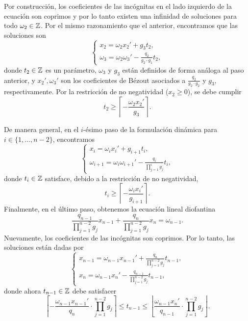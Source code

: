 Por construcción, los coeficientes de las incógnitas en el lado izquierdo de la ecuación son
coprimos y por lo tanto existen una infinidad de soluciones para todo $\omega_2 \in \mathbb{Z}$. Por el
mismo razonamiento que el anterior, encontramos que las soluciones son
\begin{equation*}
	\begin{cases}
		x_2 = \omega_2x_2' + g_3t_2, \\
		\omega_3 = \omega_2\omega_3' - \frac{q_2}{g_2 \cdot g_1}t_2,
	\end{cases}
\end{equation*}
donde $t_2 \in \mathbb{Z}$ es un parámetro, $\omega_3$ y $g_3$ están definidos de forma análoga al paso
anterior, y $x_2', \omega_3'$ son los coeficientes de Bézout asociados a $\frac{q_2}{g_2 \cdot g_2}$
y $g_3$, respectivamente. Por la restricción de no negatividad ($x_2 \geq 0$), se debe cumplir
\begin{equation*}
	t_2 \geq \left\lceil -\frac{\omega_2x_2'}{g_3} \right\rceil.
\end{equation*}

De manera general, en el $i$-ésimo paso de la formulación dinámica para $i \in \lbrace 1, \ldots, n
- 2 \rbrace$, encontramos
\begin{equation}
	\label{phase-1:eq:recursive}
	\begin{cases}
		x_i = \omega_ix_i' + g_{i + 1}t_i, \\
		\omega_{i + 1} = \omega_i\omega_{i + 1}' - \frac{q_i}{\prod_{j=1}^{i}g_j}t_i,
	\end{cases}
\end{equation}
donde $t_i \in \mathbb{Z}$ satisface, debido a la restricción de no negatividad,
\begin{equation}
	\label{phase-1:eq:param-bound}
	t_i \geq \left\lceil -\frac{\omega_ix_i'}{g_{i + 1}} \right\rceil.
\end{equation}
Finalmente, en el último paso, obtenemos la ecuación lineal diofantina
\begin{equation}
	\label{phase-1:eq:stopping}
	\frac{q_{n-1}}{\prod_{j=1}^{n-2}g_j}x_{n-1} +
	\frac{q_{n}}{\prod_{j=1}^{n-2}g_j}x_n
	= \omega_{n-1}.
\end{equation}
Nuevamente, los coeficientes de las incógnitas son coprimos. Por lo tanto, las soluciones están
dadas por
\begin{equation}
	\label{phase-1:eq:lastsol}
	\begin{cases}
		x_{n-1} = \omega_{n-1}x_{n-1}' + \frac{q_n}{\prod_{j=1}^{n-2}g_j}t_{n-1}, \\
		x_n = \omega_{n-1}x_n' - \frac{q_{n-1}}{\prod_{j=1}^{n-2}g_j}t_{n-1},
	\end{cases}
\end{equation}
donde ahora $t_{n-1} \in \mathbb{Z}$ debe satisfacer
\begin{equation}
	\label{phase-1:eq:feasible-param}
	\left\lceil -\frac{\omega_{n-1}x_{n-1}'}{q_n} \cdot \prod_{j=1}^{n-2}g_j \right\rceil
	\leq
	t_{n-1}
	\leq
	\left\lfloor \frac{\omega_{n-1}x_n'}{q_{n-1}} \cdot \prod_{j=1}^{n-2}g_j \right\rfloor.
\end{equation}

